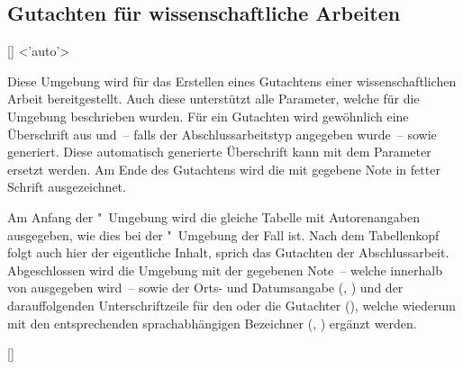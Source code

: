 \begin{DeclareEntity}{}
\section{%
  Gutachten für wissenschaftliche Arbeiten%
}

\begin{Declaration}
  {[]}
  <'auto'>
\begin{Declaration}
  {}
\begin{Declaration}
  {}
\printdeclarationlist

Diese Umgebung wird für das Erstellen eines Gutachtens einer wissenschaftlichen 
Arbeit bereitgestellt. Auch diese unterstützt alle Parameter, welche für die 
Umgebung  beschrieben wurden. Für ein Gutachten wird 
gewöhnlich eine Überschrift aus  und~-- falls der 
Abschlussarbeitstyp angegeben wurde~--  sowie 
 generiert. Diese automatisch generierte Überschrift kann mit dem 
Parameter  ersetzt werden. Am Ende des 
Gutachtens wird die mit  gegebene Note in 
fetter Schrift ausgezeichnet.

Am Anfang der "~Umgebung wird die gleiche Tabelle mit 
Autorenangaben ausgegeben, wie dies bei der "~Umgebung der 
Fall ist. Nach dem Tabellenkopf folgt auch hier der eigentliche Inhalt, sprich 
das Gutachten der Abschlussarbeit. Abgeschlossen wird die Umgebung mit der 
gegebenen Note~-- welche innerhalb von  ausgegeben wird~-- 
sowie der Orts- und Datumsangabe (, ) und der 
darauffolgenden Unterschriftzeile für den oder die Gutachter (), 
welche wiederum mit den entsprechenden sprachabhängigen Bezeichner 
(, ) ergänzt werden.
\end{Declaration}
\end{Declaration}
\end{Declaration}

\begin{Declaration}
  {%
    [\OList{}]%
  }
\printdeclarationlist


\end{Declaration}
\end{DeclareEntity}
